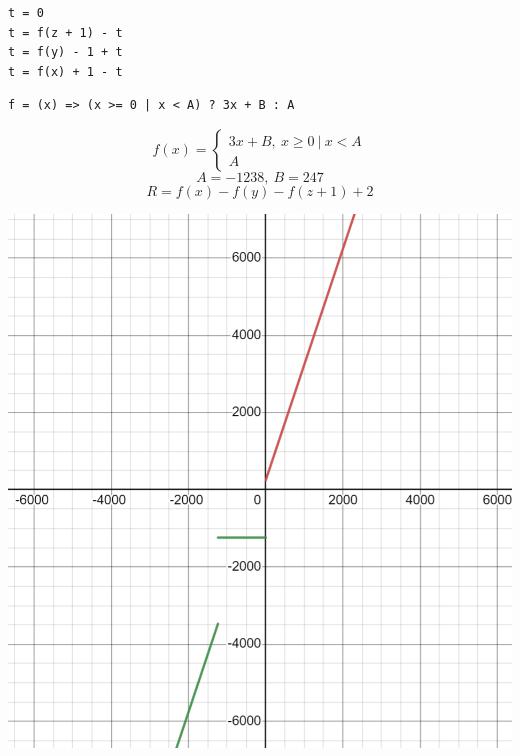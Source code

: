 \documentclass{article}
\begin{document}





















\begin{lstlisting}
t = 0
t = f(z + 1) - t
t = f(y) - 1 + t
t = f(x) + 1 - t
\end{lstlisting}
\begin{lstlisting}
f = (x) => (x >= 0 | x < A) ? 3x + B : A
\end{lstlisting}

$$
  f(x) = \begin{cases}
    3x + B,\  x \ge 0\ |\ x < A \\
    A
  \end{cases}
$$
$$   A = -1238,\ B = 247$$
$$    R = f(x) - f(y) - f(z + 1) + 2 $$
\begin{center}
  \includegraphics[scale=0.8]{graph.png}
\end{center}
\end{document}
